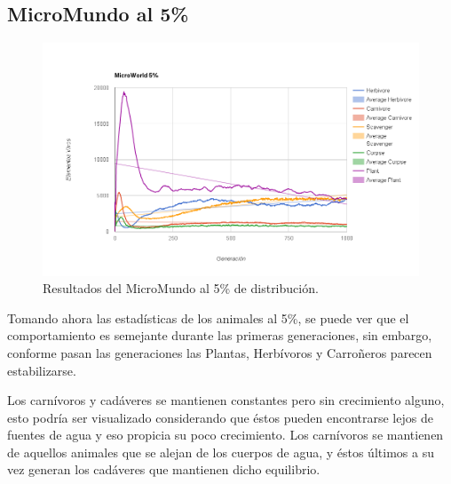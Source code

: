     \subsection{MicroMundo al 5\%}      
      \begin{figure}[h!]
        \centering
          \includegraphics[width=\textwidth]{./images/0_05.png}
          \caption{Resultados del MicroMundo al 5\% de distribución.} 
      \end{figure}      
      Tomando ahora las estadísticas de los animales al 5\%, se puede ver que el comportamiento es semejante durante las primeras generaciones, sin embargo, conforme pasan las generaciones las Plantas, Herbívoros y Carroñeros parecen estabilizarse. 
      
      Los carnívoros y cadáveres se mantienen constantes pero sin crecimiento alguno, esto podría ser visualizado considerando que éstos pueden encontrarse lejos de fuentes de agua y eso propicia su poco crecimiento. Los carnívoros se mantienen de aquellos animales que se alejan de los cuerpos de agua, y éstos últimos a su vez generan los cadáveres que mantienen dicho equilibrio.
    \linebreak
    \newpage
